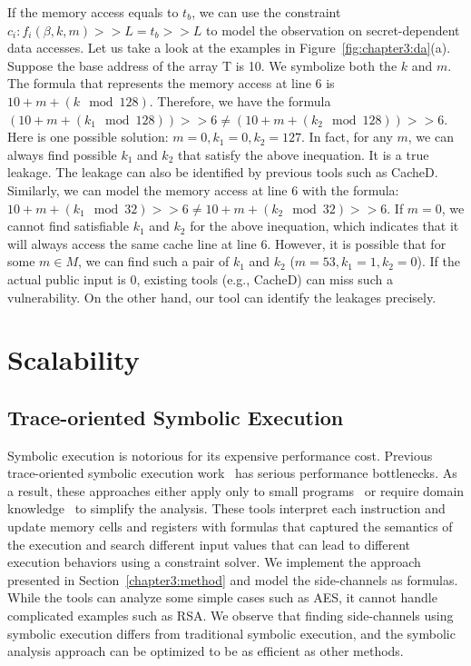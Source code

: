 If the memory access equals to $t_b$, we can use the constraint $c_i :
  f_i(\beta, k, m) >> L = t_b >> L$ to model the observation on secret-dependent
data accesses. Let us take a look at the examples in Figure~\ref{fig:chapter3:da}(a).
Suppose the base address of the array \textsf{T} is 10. We symbolize both the $k$ and $m$. The formula that represents the memory access at line 6 is $10 + m + (k \mod 128)$. Therefore, we have the formula $(10 + m + (k_1 \mod 128)) >> 6  \neq (10 + m + (k_2 \mod 128)) >> 6$.
Here is one possible solution: $m = 0, k_1 = 0, k_2 = 127$. In fact, for any $m$, we can always find possible $k_1$ and $k_2$ that satisfy the above inequation. It is a true leakage. The leakage can also be identified by previous tools such as CacheD. Similarly, we can model the memory access at line 6 with the formula:  $10 + m + (k_1 \mod 32) >> 6  \neq 10 + m + (k_2 \mod 32) >> 6$. If $m = 0$, we cannot find satisfiable $k_1$ and $k_2$ for the above inequation, which indicates that it will always access the same cache line at line 6. However, it is possible that for some $m \in M$, we can find such a pair of $k_1$ and $k_2$ ($m = 53, k_1 = 1, k_2 = 0$). If the actual public input is $0$, existing tools (e.g., CacheD) can miss such a vulnerability. On the other hand, our tool can identify the leakages precisely.

\section{Scalability}
\subsection{Trace-oriented Symbolic Execution}
Symbolic execution is notorious for its expensive performance cost.
Previous trace-oriented symbolic execution
work~\cite{203878,Chattopadhyay:2017:QIL:3127041.3127044} has serious
performance bottlenecks. As a result, these approaches either apply only to
small programs~\cite{Chattopadhyay:2017:QIL:3127041.3127044} or require
domain knowledge~\cite{Wang:2007:NCD:1250662.1250723} to simplify the analysis.
These tools interpret each
instruction and update memory cells and registers with formulas that
captured the semantics of the execution and search different input values that
can lead to different execution behaviors using a constraint solver.
We implement the approach presented in Section~\ref{chapter3:method} and model the side-channels as formulas. While the tools can analyze some simple cases such as AES, it cannot handle complicated examples such as RSA.
We observe that finding side-channels using symbolic execution differs from
traditional symbolic execution, and the symbolic analysis approach can be optimized to be as efficient
as other methods.

